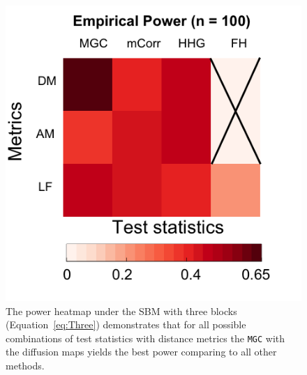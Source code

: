 \documentclass[11pt]{article}
\theoremstyle{definition}
\begin{document}
\begin{figure}
	\centering
	\includegraphics[width=0.4\paperwidth, height=0.4\paperwidth]{ThreeSBM.png}
	\caption{The power heatmap under the SBM with three blocks (Equation~\ref{eq:Three}) demonstrates that for all possible combinations of test statistics with distance metrics the \texttt{MGC} with the diffusion maps yields the best power comparing to all other methods.}
	\label{fig:threeSBM}
\end{figure}
\end{document}
